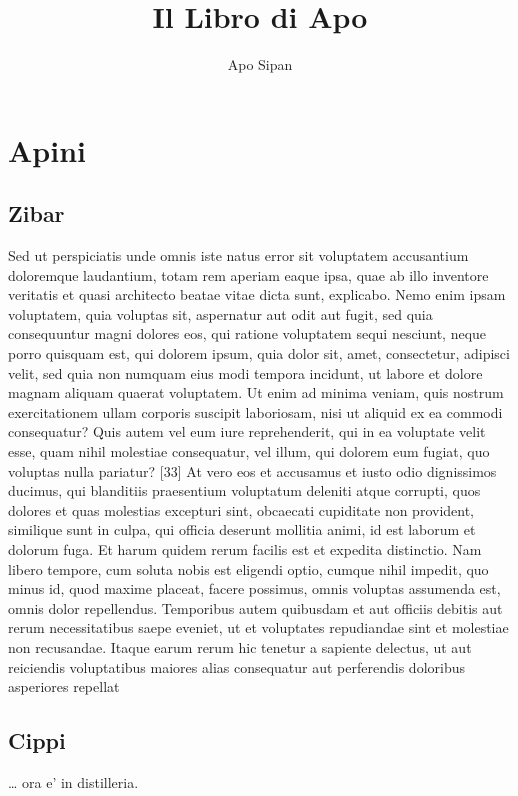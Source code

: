 \documentclass[a4paper,11pt]{article}
\author{Apo Sipan}
\title{Il Libro di Apo}
\date{}
\begin{document}
	\maketitle
	\tableofcontents
	
\newpage
	\section{Apini}
	\subsection{Zibar}
	Sed ut perspiciatis unde omnis iste natus error sit voluptatem accusantium doloremque laudantium, totam rem aperiam eaque ipsa, quae ab illo inventore veritatis et quasi architecto beatae vitae dicta sunt, explicabo. Nemo enim ipsam voluptatem, quia voluptas sit, aspernatur aut odit aut fugit, sed quia consequuntur magni dolores eos, qui ratione voluptatem sequi nesciunt, neque porro quisquam est, qui dolorem ipsum, quia dolor sit, amet, consectetur, adipisci velit, sed quia non numquam eius modi tempora incidunt, ut labore et dolore magnam aliquam quaerat voluptatem. Ut enim ad minima veniam, quis nostrum exercitationem ullam corporis suscipit laboriosam, nisi ut aliquid ex ea commodi consequatur? Quis autem vel eum iure reprehenderit, qui in ea voluptate velit esse, quam nihil molestiae consequatur, vel illum, qui dolorem eum fugiat, quo voluptas nulla pariatur? [33] At vero eos et accusamus et iusto odio dignissimos ducimus, qui blanditiis praesentium voluptatum deleniti atque corrupti, quos dolores et quas molestias excepturi sint, obcaecati cupiditate non provident, similique sunt in culpa, qui officia deserunt mollitia animi, id est laborum et dolorum fuga. Et harum quidem rerum facilis est et expedita distinctio. Nam libero tempore, cum soluta nobis est eligendi optio, cumque nihil impedit, quo minus id, quod maxime placeat, facere possimus, omnis voluptas assumenda est, omnis dolor repellendus. Temporibus autem quibusdam et aut officiis debitis aut rerum necessitatibus saepe eveniet, ut et voluptates repudiandae sint et molestiae non recusandae. Itaque earum rerum hic tenetur a sapiente delectus, ut aut reiciendis voluptatibus maiores alias consequatur aut perferendis doloribus asperiores repellat
	\subsection{Cippi}
	\ldots{} ora e' in distilleria.
\newpage

	
\end{document}
